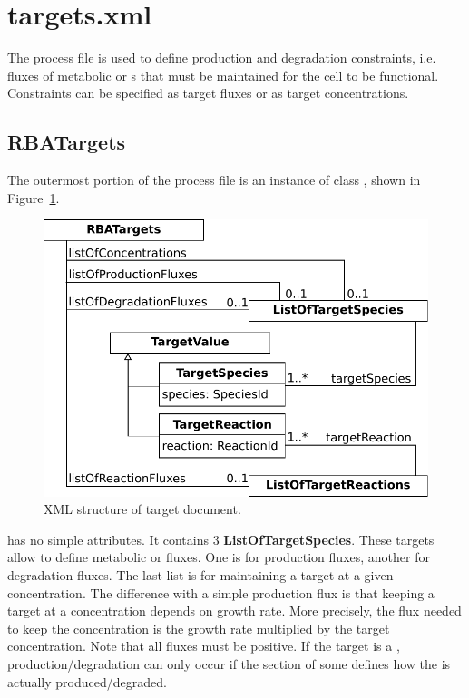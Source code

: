 
\section{targets.xml}

The process file is used to define production and degradation constraints,
i.e. fluxes of metabolic \species{} or \macromolecule{}s that must be maintained
for the cell to be functional.
Constraints can be specified as target fluxes or as target concentrations.

\subsection{RBATargets}
\label{sec:rba_targets}

The outermost portion of the process file is an instance of class
\rbatargets, shown in Figure~\ref{fig:targets_doc}.

\begin{figure}
  \centering
  \includegraphics[scale=0.8]{figures/targets_doc}
  \caption{XML structure of target document.}
\label{fig:targets_doc}
\end{figure}

\rbatargets{} has no simple attributes.
It contains 3 \textbf{ListOfTargetSpecies}.
These targets allow to define metabolic \species{} or \macromolecule{} fluxes.
One is for production fluxes, another for degradation fluxes.
The last list is for maintaining a target at a given concentration.
The difference with a simple production flux is that keeping a target at a
concentration depends on growth rate.
More precisely, the flux needed to keep the concentration is
the growth rate multiplied by the target concentration.
Note that all fluxes must be positive.
If the target is a \macromolecule, production/degradation can only occur
if the \processings{} section of some \process{} defines how the
\macromolecule{} is actually produced/degraded.

